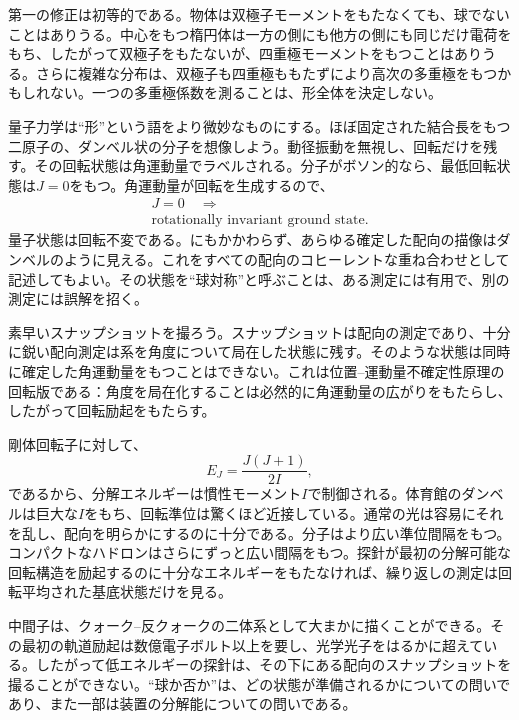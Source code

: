 第一の修正は初等的である。物体は双極子モーメントをもたなくても、球でないことはありうる。中心をもつ楕円体は一方の側にも他方の側にも同じだけ電荷をもち、したがって双極子をもたないが、四重極モーメントをもつことはありうる。さらに複雑な分布は、双極子も四重極ももたずにより高次の多重極をもつかもしれない。一つの多重極係数を測ることは、形全体を決定しない。

量子力学は``形''という語をより微妙なものにする。ほぼ固定された結合長をもつ二原子の、ダンベル状の分子を想像しよう。動径振動を無視し、回転だけを残す。その回転状態は角運動量でラベルされる。分子がボソン的なら、最低回転状態は\(J=0\)をもつ。角運動量が回転を生成するので、
\begin{equation}
\begin{gathered}
J=0 \quad\Longrightarrow\\
\text{rotationally invariant ground state.}
\end{gathered}
\end{equation}
量子状態は回転不変である。にもかかわらず、あらゆる確定した配向の描像はダンベルのように見える。これをすべての配向のコヒーレントな重ね合わせとして記述してもよい。その状態を``球対称''と呼ぶことは、ある測定には有用で、別の測定には誤解を招く。

素早いスナップショットを撮ろう。スナップショットは配向の測定であり、十分に鋭い配向測定は系を角度について局在した状態に残す。そのような状態は同時に確定した角運動量をもつことはできない。これは位置--運動量不確定性原理の回転版である：角度を局在化することは必然的に角運動量の広がりをもたらし、したがって回転励起をもたらす。

剛体回転子に対して、
\begin{equation}
E_J=\frac{J(J+1)}{2I},
\end{equation}
であるから、分解エネルギーは慣性モーメント\(I\)で制御される。体育館のダンベルは巨大な\(I\)をもち、回転準位は驚くほど近接している。通常の光は容易にそれを乱し、配向を明らかにするのに十分である。分子はより広い準位間隔をもつ。コンパクトなハドロンはさらにずっと広い間隔をもつ。探針が最初の分解可能な回転構造を励起するのに十分なエネルギーをもたなければ、繰り返しの測定は回転平均された基底状態だけを見る。

中間子は、クォーク--反クォークの二体系として大まかに描くことができる。その最初の軌道励起は数億電子ボルト以上を要し、光学光子をはるかに超えている。したがって低エネルギーの探針は、その下にある配向のスナップショットを撮ることができない。``球か否か''は、どの状態が準備されるかについての問いであり、また一部は装置の分解能についての問いである。

